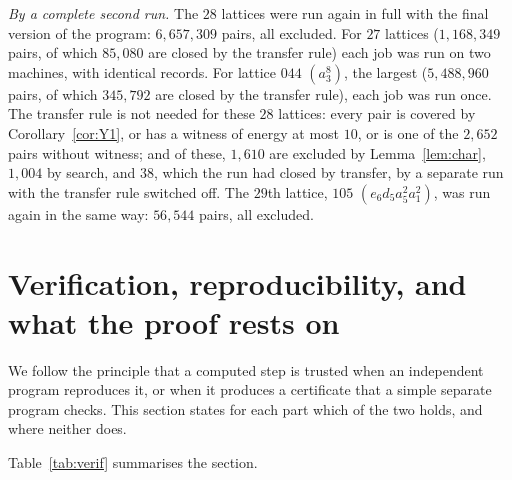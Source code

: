 \documentclass[11pt]{amsart}
\theoremstyle{definition}
\theoremstyle{remark}
\begin{document}
\emph{By a complete second run.} The $28$ lattices were run again in full with the final version of the program:
$6{,}657{,}309$ pairs, all excluded. For $27$ lattices ($1{,}168{,}349$ pairs, of which $85{,}080$ are closed by the transfer
rule) each job was run on two machines, with identical records. For lattice $044$ $(a_3^8)$, the largest ($5{,}488{,}960$
pairs, of which $345{,}792$ are closed by the transfer rule), each job was run once. The transfer rule is not needed for
these $28$ lattices: every pair is covered by Corollary~\ref{cor:Y1}, or has a witness of energy at most $10$, or is one of
the $2{,}652$ pairs without witness; and of these, $1{,}610$ are excluded by Lemma~\ref{lem:char}, $1{,}004$ by search, and
$38$, which the run had closed by transfer, by a separate run with the transfer rule switched off. The $29$th lattice, $105$ $(e_6d_5a_5^2a_1^2)$, was run again in the same way: $56{,}544$ pairs, all excluded.

\section{Verification, reproducibility, and what the proof rests on}\label{sec:verif}

We follow the principle that a computed step is trusted when an independent program reproduces it, or when it produces a
certificate that a simple separate program checks. This section states for each part which of the two holds, and where
neither does.

Table~\ref{tab:verif} summarises the section.
\end{document}
